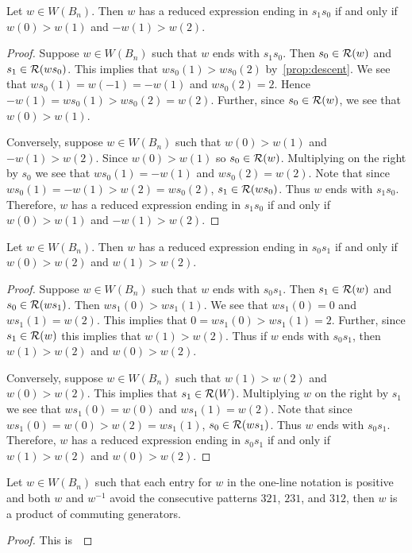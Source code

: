 \begin{lemma}\label{lem:endswiths0}
Let $w \in W(B_n)$. Then $w$ has a reduced expression ending in $s_1s_0$ if and only if $w(0)>w(1)$ and $-w(1)>w(2)$.
\begin{proof}
	Suppose $w \in W(B_n)$ such that $w$ ends with $s_1s_0$. Then $s_0 \in \mathcal{R}(w)$ and $s_1 \in \mathcal{R}(ws_0)$. This implies that $ws_0(1)>ws_0(2)$ by~\ref{prop:descent}. We see that $ws_0(1)=w(-1)=-w(1)$ and $ws_0(2)=2$. Hence $-w(1)=ws_0(1)>ws_0(2)=w(2)$. Further, since $s_0 \in \mathcal{R}(w)$, we see that $w(0)>w(1)$.
	
	Conversely, suppose $w \in W(B_n)$ such that $w(0)>w(1)$ and $-w(1)>w(2)$. Since $w(0)>w(1)$ so $s_0 \in \mathcal{R}(w)$. Multiplying on the right by $s_0$ we see that $ws_0(1)=-w(1)$ and $ws_0(2)=w(2)$. Note that since $ws_0(1)=-w(1)>w(2)=ws_0(2)$, $s_1 \in \mathcal{R}(ws_0)$. Thus $w$ ends with $s_1s_0$. Therefore, $w$ has a reduced expression ending in $s_1s_0$ if and only if $w(0)>w(1)$ and $-w(1)>w(2)$.
\end{proof}
\end{lemma}

\begin{lemma}\label{lem:endswiths_1}
Let $w \in W(B_n)$. Then $w$ has a reduced expression ending in $s_0s_1$ if and only if $w(0)>w(2)$ and $w(1)>w(2)$.
\begin{proof}
	Suppose $w \in W(B_n)$ such that $w$ ends with $s_0s_1$. Then $s_1 \in \mathcal{R}(w)$ and $s_0 \in \mathcal{R}(ws_1)$. Then $ws_1(0)>ws_1(1)$. We see that $ws_1(0)=0$ and $ws_1(1)=w(2)$. This implies that $0=ws_1(0)>ws_1(1)=2$. Further, since $s_1 \in \mathcal{R}(w)$ this implies that $w(1) > w(2)$. Thus if $w$ ends with $s_0s_1$, then $w(1)>w(2)$ and $w(0)>w(2)$.
	
	Conversely, suppose $w \in W(B_n)$ such that $w(1)>w(2)$ and $w(0)>w(2)$. This implies that $s_1 \in \mathcal{R}(W)$. Multiplying $w$ on the right by $s_1$ we see that $ws_1(0)=w(0)$ and $ws_1(1)=w(2)$. Note that since $ws_1(0)=w(0)>w(2)=ws_1(1)$, $s_0 \in \mathcal{R}(ws_1)$. Thus $w$ ends with $s_0s_1$. Therefore, $w$ has a reduced expression ending in $s_0s_1$ if and only if $w(1)>w(2)$ and $w(0)>w(2)$.
\end{proof}	
\end{lemma}

\begin{lemma}\label{lem:prodofcommA}
Let $w \in W(B_n)$ such that each entry for $w$ in the one-line notation is positive and both $w$ and $w^{-1}$ avoid the consecutive patterns $321$, $231$, and $312$, then $w$ is a product of commuting generators.
\begin{proof}
	This is~\cite[Lemma 2.2.9]{Gern2013a}
\end{proof}	
\end{lemma}

